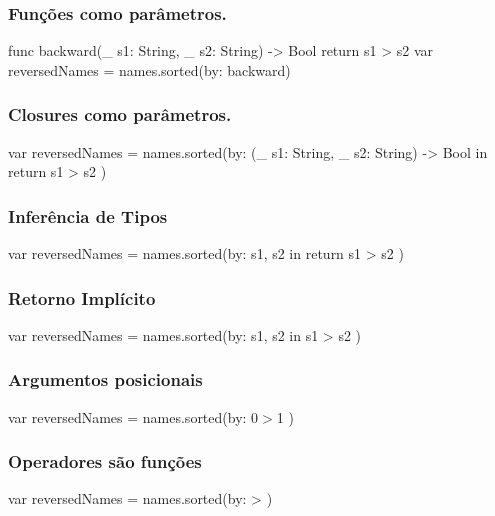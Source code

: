 \begin{frame}[fragile]
    \frametitle{Funções como parâmetros.}

    \begin{swift}
        func backward(_ s1: String, _ s2: String) -> Bool {
            return s1 > s2
        }
        var reversedNames = names.sorted(by: backward)
    \end{swift}
\end{frame}

\begin{frame}[fragile]
    \frametitle{Closures  como parâmetros.}

    \begin{swift}
    var reversedNames =
        names.sorted(by: {(_ s1: String, _ s2: String) -> Bool in
            return s1 > s2
        })
    \end{swift}
\end{frame}

\begin{frame}[fragile]
    \frametitle{Inferência de Tipos}

    \begin{swift}
        var reversedNames = names.sorted(by: { s1, s2 in
                return s1 > s2
            })
    \end{swift}
\end{frame}

\begin{frame}[fragile]
    \frametitle{Retorno Implícito}

    \begin{swift}
        var reversedNames =
            names.sorted(by: { s1, s2 in s1 > s2 })
    \end{swift}
\end{frame}

\begin{frame}[fragile]
    \frametitle{Argumentos posicionais}

    \begin{swift}
        var reversedNames = names.sorted(by: { $0 > $1 })
    \end{swift}
\end{frame}

\begin{frame}[fragile]
    \frametitle{Operadores são funções}

    \begin{swift}
        var reversedNames = names.sorted(by: > )
    \end{swift}
\end{frame}

